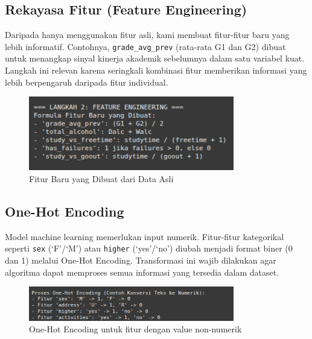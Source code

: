 \subsection{Rekayasa Fitur (Feature Engineering)}
Daripada hanya menggunakan fitur asli, kami membuat fitur-fitur baru yang lebih informatif. Contohnya, \texttt{grade\_avg\_prev} (rata-rata G1 dan G2) dibuat untuk menangkap sinyal kinerja akademik sebelumnya dalam satu variabel kuat. Langkah ini relevan karena seringkali kombinasi fitur memberikan informasi yang lebih berpengaruh daripada fitur individual.
\begin{figure}[h!]
    \centering
    \includegraphics[width=0.8\textwidth]{images/FeatureEng.png}
    \caption{Fitur Baru yang Dibuat dari Data Asli}
\end{figure}

\subsection{One-Hot Encoding}
Model machine learning memerlukan input numerik. Fitur-fitur kategorikal seperti \texttt{sex} (`F'/`M') atau \texttt{higher} (`yes'/`no') diubah menjadi format biner (0 dan 1) melalui One-Hot Encoding. Transformasi ini wajib dilakukan agar algoritma dapat memproses semua informasi yang tersedia dalam dataset.
\begin{figure}[h!]
    \centering
    \includegraphics[width=0.8\textwidth]{images/OHE.png}
    \caption{One-Hot Encoding untuk fitur dengan value non-numerik}
\end{figure}
